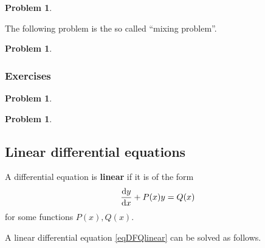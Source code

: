 \documentclass[12pt]{book}
\newtheorem{problem}[theorem]{Problem}
\renewcommand{\emph}{\textbf}
\newcommand{\additionalProblemLabel}{}
\begin{document}
\begin{problem}~\label{problemDFQseparable-yprime=ysquared-1}

\end{problem}
\renewcommand{\additionalProblemLabel}{\ref{problemDFQseparable-yprime=ysquared-1}.}

\renewcommand{\additionalProblemLabel}{}

The following problem is the so called ``mixing problem''.
\begin{problem}

\end{problem}


\subsubsection{Exercises}
\begin{problem} 
\end{problem}
\begin{problem}

\end{problem}
\subsection{Linear differential equations}
A differential equation is \emph{linear} if it is of the form
\begin{equation}\label{eqDFQlinear}
\frac{{\normalfont \text{d}} y}{{\normalfont \text{d}} x} + P(x)y=Q(x)
\end{equation}
for some functions $P(x),Q(x)$.

A linear differential equation \eqref{eqDFQlinear} can be solved as follows.
\end{document}
